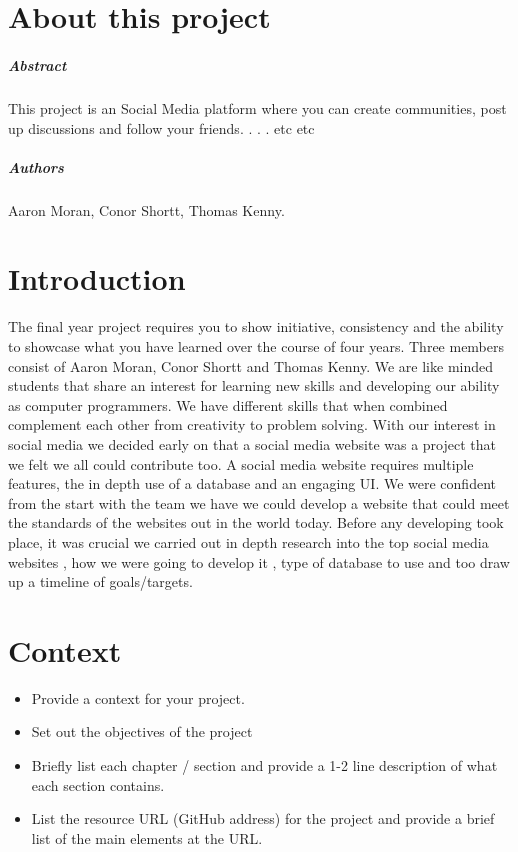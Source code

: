 
\chapter*{About this project}
\paragraph{Abstract}
This project is an Social Media platform where you can create communities, post up discussions and follow your friends. . . .  etc etc

\paragraph{Authors}
Aaron Moran, Conor Shortt, Thomas Kenny.

\chapter{Introduction}
The final year project requires you to show initiative, consistency and the ability to showcase what you have learned over the course of four years.
Three members consist of Aaron Moran, Conor Shortt and Thomas Kenny. We are like minded students that share an interest for learning new skills and developing our ability as computer programmers. We have different skills that when combined complement each other from creativity to problem solving. With our interest in social media we decided early on that a social media website was a project that we felt we all could contribute too. A social media website requires multiple features, the in depth use of a database and an engaging UI. We were confident from the start with the team we have we could develop a website that could meet the standards of the websites out in the world today.
Before any developing took place, it was crucial we carried out in depth research into the top social media websites , how we were going to develop it , type of database to use and too draw up a timeline of goals/targets.

\newpage

\chapter{Context}
\begin{itemize}
\item Provide a context for your project.

\item Set out the objectives of the project
\item Briefly list each chapter / section and provide a 1-2 line description of what each section contains.
\item List the resource URL (GitHub address) for the project and provide a brief list of the main elements at the URL.
\end{itemize}

